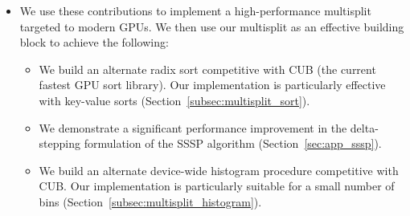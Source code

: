 \begin{itemize}
\item We use these contributions to implement a high-performance multisplit targeted to modern GPUs. We then use our multisplit as an effective building block to achieve the following:
  \begin{itemize}
  \item We build an alternate radix sort competitive with CUB (the current fastest GPU sort library). Our implementation is particularly effective with key-value sorts (Section~\ref{subsec:multisplit_sort}).
  \item We demonstrate a significant performance improvement in the delta-stepping formulation of the SSSP algorithm (Section~\ref{sec:app_sssp}).
  \item We build an alternate device-wide histogram procedure competitive with CUB\@. Our implementation is particularly suitable for a small number of bins (Section~\ref{subsec:multisplit_histogram}).
  \end{itemize}
\end{itemize}

